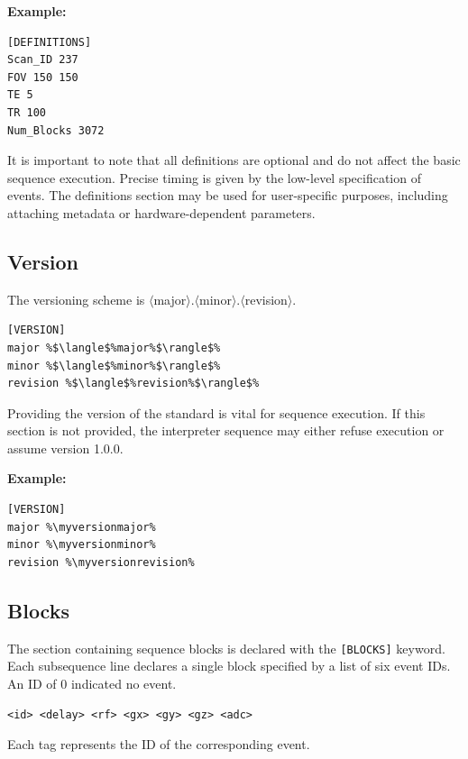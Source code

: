 \documentclass{article}
\def\myversionmajor{1}
\def\myversionminor{2}
\def\myversionrevision{1}
\begin{document}
\textbf{Example:}
\begin{lstlisting}
[DEFINITIONS]
Scan_ID 237
FOV 150 150
TE 5
TR 100
Num_Blocks 3072
\end{lstlisting}
It is important to note that all definitions are optional and do not affect the basic sequence execution. Precise timing is given by the low-level specification of events. The definitions section may be used for user-specific purposes, including attaching metadata or hardware-dependent parameters.

\subsection{Version}

The versioning scheme is $\langle$major$\rangle$.$\langle$minor$\rangle$.$\langle$revision$\rangle$.

\begin{lstlisting}[escapechar=\%]
[VERSION]
major %$\langle$%major%$\rangle$%
minor %$\langle$%minor%$\rangle$%
revision %$\langle$%revision%$\rangle$%
\end{lstlisting}

Providing the version of the standard is vital for sequence execution.
If this section is not provided, the interpreter sequence may either refuse execution or assume version 1.0.0.

\textbf{Example:}
\begin{lstlisting}[escapechar=\%]
[VERSION]
major %\myversionmajor%
minor %\myversionminor%
revision %\myversionrevision%
\end{lstlisting}

\subsection{Blocks}

The section containing sequence blocks is declared with the \verb.[BLOCKS]. keyword. Each subsequence line declares a single block specified by a list of six event IDs. An ID of 0 indicated no event.
\begin{lstlisting}
<id> <delay> <rf> <gx> <gy> <gz> <adc>
\end{lstlisting}

Each tag represents the ID of the corresponding event.
\end{document}
